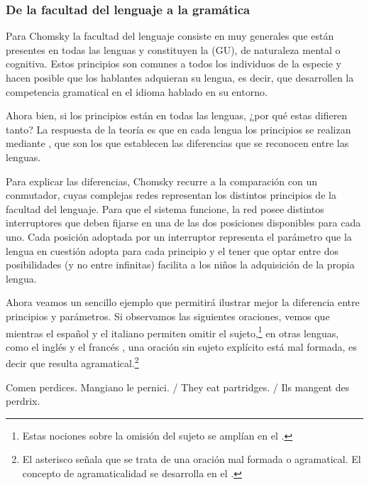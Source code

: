 \subsubsection{De la facultad del lenguaje a la gramática}

Para Chomsky la facultad del lenguaje consiste en  muy
generales que están presentes en todas las lenguas y constituyen la
 (GU), de naturaleza mental o cognitiva. Estos
principios son comunes a todos los individuos de la especie y hacen posible que
los hablantes adquieran su lengua, es decir, que desarrollen la competencia
gramatical en el idioma hablado en su entorno.

Ahora bien, si los principios están en todas las lenguas, ¿por qué estas
difieren tanto? La respuesta de la teoría es que en cada lengua los principios
se realizan mediante , que son los que establecen las
diferencias que se reconocen entre las lenguas.

Para explicar las diferencias, Chomsky recurre a la comparación con un
conmutador, cuyas complejas redes representan los distintos principios de la
facultad del lenguaje. Para que el sistema funcione, la red posee distintos
interruptores que deben fijarse en una de las dos posiciones disponibles para
cada uno. Cada posición adoptada por un interruptor representa el parámetro que
la lengua en cuestión adopta para cada principio y el tener que optar entre dos
posibilidades (y no entre infinitas) facilita a los niños la adquisición de la
propia lengua.


Ahora veamos un sencillo ejemplo que permitirá ilustrar mejor la diferencia
entre principios y parámetros. Si observamos las siguientes oraciones, vemos
que mientras el español  y el italiano
 permiten omitir el sujeto,\footnote{Estas nociones
sobre la omisión del sujeto se amplían en el .} en otras lenguas,
como el inglés  y el francés ,
una oración sin sujeto explícito está mal formada, es decir que resulta
agramatical.\footnote{El asterisco señala que se trata de una oración mal
formada o agramatical. El concepto de agramaticalidad se desarrolla en el
.}

\begin{exe}
  \ex\label{ex:01-sujnulo}
    \begin{xlist}
      \ex\label{ex:01-sujnulo-a} Comen perdices.
      \ex\label{ex:01-sujnulo-b} Mangiano le pernici.
      \ex\label{ex:01-sujnulo-c}  / They eat partridges.
      \ex\label{ex:01-sujnulo-d}  / Ils mangent des perdrix.
    \end{xlist}
\end{exe}


